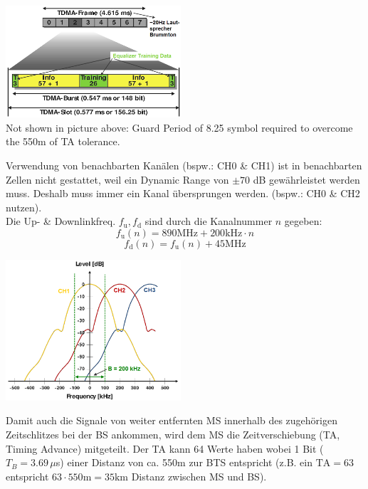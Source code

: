    \begin{minipage}{6.5cm}        
        \includegraphics[width=6.5cm]{./bilder/systems-tdma.png} \\
        Not shown in picture above: Guard Period of 8.25 symbol required to overcome the 550m of TA tolerance.
    \end{minipage}
    \begin{minipage}{0.5cm}        
        \quad
    \end{minipage}
    \begin{minipage}{5.4cm} 
         \small
        Verwendung von benachbarten Kanälen (bspw.: CH0 \& CH1) ist in benachbarten Zellen nicht gestattet, weil ein
        Dynamic Range von $\pm 70$ dB gewährleistet werden muss. Deshalb muss immer ein Kanal übersprungen werden. 
        (bspw.: CH0 \& CH2 nutzen). \\
        Die Up- \& Downlinkfreq. $f_{\text{u}},f_{\text{d}}$ sind durch die Kanalnummer $n$ gegeben:
            $$f_{\text{u}}(n)=890\text{MHz} + 200\text{kHz}\cdot n$$
            $$f_{\text{d}}(n)=f_{\text{u}}(n)+45\text{MHz}$$
        \normalsize
    \end{minipage}
    \begin{minipage}{6.5cm}        
        \includegraphics[width=6.5cm]{./bilder/systems-gsm-spectrum.png}
    \end{minipage}

	Damit auch die Signale von weiter entfernten MS innerhalb des zugehörigen Zeitschlitzes bei der BS ankommen, wird 
	dem MS die Zeitverschiebung (TA, Timing Advance) mitgeteilt. Der TA kann 64 Werte haben wobei 1 Bit ($T_B=3.69$\,$\mu$s) einer 
	Distanz von ca. 550m zur BTS entspricht (z.B. ein $\text{TA}=63$ entspricht $63 \cdot 550\text{m} = 35\text{km}$ Distanz zwischen MS und BS).

